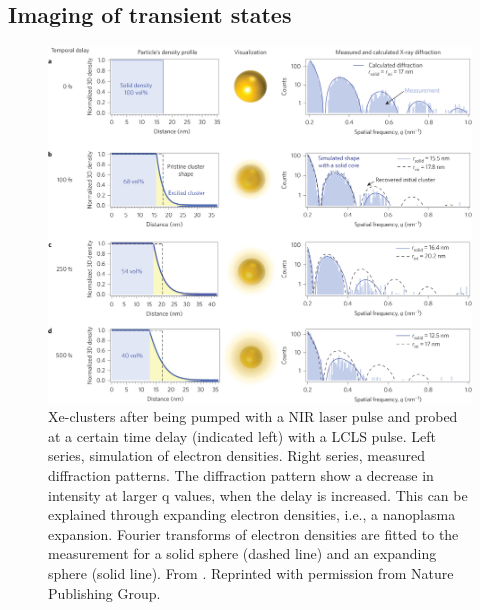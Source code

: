 \subsection{Imaging of transient states}
\begin{figure}
	\centering
		\includegraphics[width=1.00\textwidth]{images/tais-nat-photonics.jpg}
	\caption[Measurement and simulation of the nanoplasma expansion in Xe-cluster.]{Xe-clusters after being pumped with a NIR laser pulse and probed at a certain time delay (indicated left) with a LCLS pulse. Left series, simulation of electron densities. Right series, measured diffraction patterns. The diffraction pattern show a decrease in intensity at larger q values, when the delay is increased. This can be explained through expanding electron densities, i.e., a nanoplasma expansion. Fourier transforms of electron densities are fitted to the measurement for a solid sphere (dashed line) and an expanding sphere (solid line). From \citep{Gorkhover-2016-NatPho}. Reprinted with permission from Nature Publishing Group.}
	\label{fig:tais-nat-photonics}
\end{figure}
